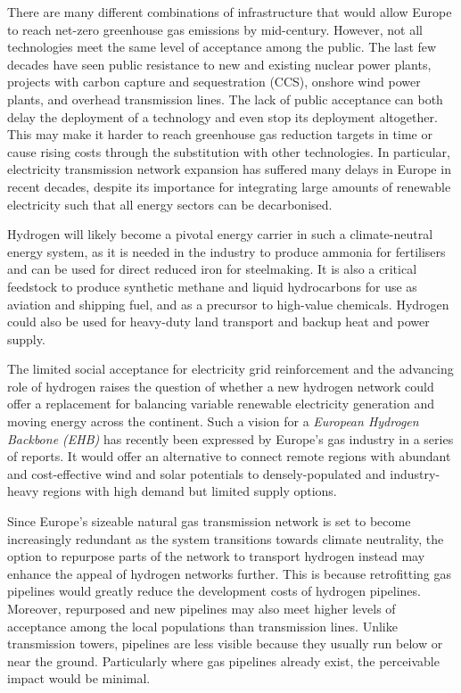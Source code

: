 
There are many different combinations of infrastructure that would allow Europe
to reach net-zero greenhouse gas emissions by mid-century. However, not all
technologies meet the same level of acceptance among the public. The last few
decades have seen public resistance to new and existing nuclear power plants,
projects with carbon capture and sequestration (CCS), onshore wind power plants,
and overhead transmission lines. The lack of public acceptance can both delay
the deployment of a technology and even stop its deployment altogether. This may
make it harder to reach greenhouse gas reduction targets in time or cause rising
costs through the substitution with other technologies. In particular,
electricity transmission network expansion has suffered many delays in Europe in
recent decades, despite its importance for integrating large amounts of
renewable electricity such that all energy sectors can be decarbonised.

Hydrogen will likely become a pivotal energy carrier in such a climate-neutral
energy system, as it is needed in the industry to produce ammonia for
fertilisers and can be used for direct reduced iron for steelmaking. It is also
a critical feedstock to produce synthetic methane and liquid hydrocarbons for
use as aviation and shipping fuel, and as a precursor to high-value chemicals.
Hydrogen could also be used for heavy-duty land transport and backup heat and
power supply.

The limited social acceptance for electricity grid reinforcement and the
advancing role of hydrogen raises the question of whether a new hydrogen network
could offer a replacement for balancing variable renewable electricity
generation and moving energy across the continent. Such a vision for a
\textit{European Hydrogen Backbone (EHB)} has recently been expressed by
Europe's gas industry in a series of reports.
\cite{gasforclimateEuropeanHydrogen2020,gasforclimateEuropeanHydrogen2021,gasforclimateExtendingEuropean2021,gasforclimateEuropeanHydrogen2022}
It would offer an alternative to connect remote regions with abundant
and cost-effective wind and solar potentials to densely-populated and
industry-heavy regions with high demand but limited supply options.

Since Europe's sizeable natural gas transmission network is set to
become increasingly redundant as the system transitions towards climate
neutrality, the option to repurpose parts of the network to transport hydrogen
instead may enhance the appeal of hydrogen networks further. This is because
retrofitting gas pipelines would greatly reduce the development costs
of hydrogen pipelines. Moreover, repurposed and new
pipelines may also meet higher levels of acceptance among the local populations
than transmission lines. Unlike transmission towers, pipelines are less visible
because they usually run below or near the ground. Particularly where gas
pipelines already exist, the perceivable impact would be minimal.


